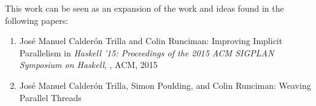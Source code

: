 This work can be seen as an expansion of the work and ideas found in the
following papers:

\begin{enumerate}
    \item Jos\'{e} Manuel Calder\'{o}n Trilla and Colin Runciman: Improving
            Implicit Parallelism in \emph{Haskell '15: Proceedings of the
            2015 ACM SIGPLAN Symposium on Haskell}, , ACM, 2015
    \item Jos\'{e} Manuel Calder\'{o}n Trilla, Simon Poulding, and Colin
            Runciman: Weaving Parallel Threads 
\end{enumerate}
